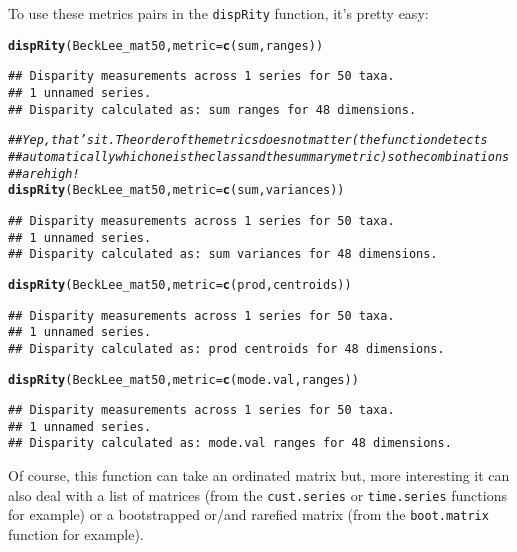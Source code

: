 \documentclass{article}\usepackage[]{graphicx}\usepackage[]{color}
\makeatletter
\newcommand{\hlcom}[1]{\textcolor[rgb]{0.678,0.584,0.686}{\textit{#1}}}%
\newcommand{\hlstd}[1]{\textcolor[rgb]{0.345,0.345,0.345}{#1}}%
\newcommand{\hlkwc}[1]{\textcolor[rgb]{0.333,0.667,0.333}{#1}}%
\newcommand{\hlkwd}[1]{\textcolor[rgb]{0.737,0.353,0.396}{\textbf{#1}}}%
\newenvironment{kframe}{%
 \def\at@end@of@kframe{}%
 \ifinner\ifhmode%
  \def\at@end@of@kframe{\end{minipage}}%
  \begin{minipage}{\columnwidth}%
 \fi\fi%
 \def\FrameCommand##1{\hskip\@totalleftmargin \hskip-\fboxsep
 \colorbox{shadecolor}{##1}\hskip-\fboxsep
     \hskip-\linewidth \hskip-\@totalleftmargin \hskip\columnwidth}%
 \MakeFramed {\advance\hsize-\width
   \@totalleftmargin\z@ \linewidth\hsize
   \@setminipage}}%
 {\par\unskip\endMakeFramed%
 \at@end@of@kframe}
\newenvironment{knitrout}{}{} %
\newcommand{\dispRity}{\texttt{dispRity} }
\makeatother
\begin{document}
To use these metrics pairs in the \dispRity function, it's pretty easy:

\begin{knitrout}
\color{fgcolor}\begin{kframe}
\begin{alltt}
\hlkwd{dispRity}\hlstd{(BeckLee_mat50,} \hlkwc{metric} \hlstd{=} \hlkwd{c}\hlstd{(sum, ranges))}
\end{alltt}
\begin{verbatim}
## Disparity measurements across 1 series for 50 taxa. 
## 1 unnamed series.
## Disparity calculated as: sum ranges for 48 dimensions.
\end{verbatim}
\begin{alltt}
\hlcom{## Yep, that's it. The order of the metrics does not matter (the function detects}
\hlcom{## automatically which one is the class and the summary metric) so the combinations}
\hlcom{## are high!}
\hlkwd{dispRity}\hlstd{(BeckLee_mat50,} \hlkwc{metric} \hlstd{=} \hlkwd{c}\hlstd{(sum, variances))}
\end{alltt}
\begin{verbatim}
## Disparity measurements across 1 series for 50 taxa. 
## 1 unnamed series.
## Disparity calculated as: sum variances for 48 dimensions.
\end{verbatim}
\begin{alltt}
\hlkwd{dispRity}\hlstd{(BeckLee_mat50,} \hlkwc{metric} \hlstd{=} \hlkwd{c}\hlstd{(prod, centroids))}
\end{alltt}
\begin{verbatim}
## Disparity measurements across 1 series for 50 taxa. 
## 1 unnamed series.
## Disparity calculated as: prod centroids for 48 dimensions.
\end{verbatim}
\begin{alltt}
\hlkwd{dispRity}\hlstd{(BeckLee_mat50,} \hlkwc{metric} \hlstd{=} \hlkwd{c}\hlstd{(mode.val, ranges))}
\end{alltt}
\begin{verbatim}
## Disparity measurements across 1 series for 50 taxa. 
## 1 unnamed series.
## Disparity calculated as: mode.val ranges for 48 dimensions.
\end{verbatim}
\end{kframe}
\end{knitrout}

Of course, this function can take an ordinated matrix but, more interesting it can also deal with a list of matrices (from the \texttt{cust.series} or \texttt{time.series} functions for example) or a bootstrapped or/and rarefied matrix (from the \texttt{boot.matrix} function for example).
\end{document}
